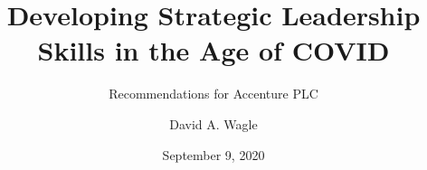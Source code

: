 \title[Strategic Skills]{Developing Strategic Leadership Skills in the Age of COVID}

\subtitle{Recommendations for Accenture PLC}

\author{David A. Wagle}


\date{September 9, 2020}


\frame{\titlepage}

